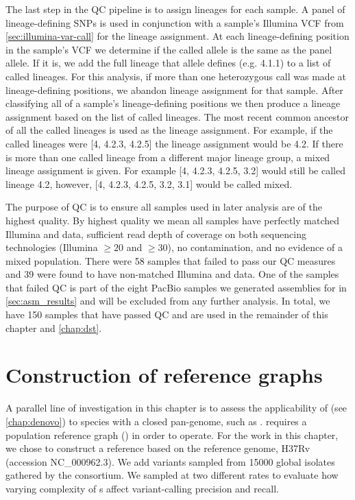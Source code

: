 The last step in the QC pipeline is to assign lineages for each sample. A panel of lineage-defining SNPs \cite{Shitikov2017,Rutaihwa2019,stucki2016} is used in conjunction with a sample's Illumina VCF from \autoref{sec:illumina-var-call} for the lineage assignment. At each lineage-defining position in the sample's VCF we determine if the called allele is the same as the panel allele. If it is, we add the full lineage that allele defines (e.g. 4.1.1) to a list of called lineages. For this analysis, if more than one heterozygous call was made at lineage-defining positions, we abandon lineage assignment for that sample. After classifying all of a sample's lineage-defining positions we then produce a lineage assignment based on the list of called lineages. The most recent common ancestor of all the called lineages is used as the lineage assignment. For example, if the called lineages were [4, 4.2.3, 4.2.5] the lineage assignment would be 4.2. If there is more than one called lineage from a different major lineage group, a mixed lineage assignment is given. For example [4, 4.2.3, 4.2.5, 3.2] would still be called lineage 4.2, however, [4, 4.2.3, 4.2.5, 3.2, 3.1] would be called mixed.

The purpose of QC is to ensure all samples used in later analysis are of the highest quality. By highest quality we mean all samples have perfectly matched Illumina and \ont{} data, sufficient read depth of coverage on both sequencing technologies (Illumina $\ge 20$ and \ont{} $\ge 30$), no contamination, and no evidence of a mixed \mtb{} population. 
There were 58 samples that failed to pass our QC measures and 39 were found to have non-matched Illumina and \ont{} data. One of the samples that failed QC is part of the eight PacBio samples we generated assemblies for in \autoref{sec:asm_results} and will be excluded from any further analysis. In total, we have 150 samples that have passed QC and are used in the remainder of this chapter and \autoref{chap:dst}.


\section{Construction of \mtb{} reference graphs}
\label{sec:tbprg}
 A parallel line of investigation in this chapter is to assess the applicability of \pandora{} (see \autoref{chap:denovo}) to species with a closed pan-genome, such as \mtb{}.
\pandora{} requires a population reference graph (\prg{}) in order to operate. For the work in this chapter, we chose to construct a reference \prg{} based on the \mtb{} reference genome, H37Rv (accession NC\_000962.3). We add variants sampled from 15000 global \mtb{} isolates gathered by the \cryptic{} consortium. We sampled at two different rates to evaluate how varying complexity of \prg{}s affect variant-calling precision and recall.

